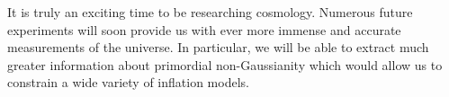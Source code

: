 It is truly an exciting time to be researching cosmology. Numerous future experiments will soon provide us with ever more immense and accurate measurements of the universe. In particular, we will be able to extract much greater information about primordial non-Gaussianity which would allow us to constrain a wide variety of inflation models.

%
%
